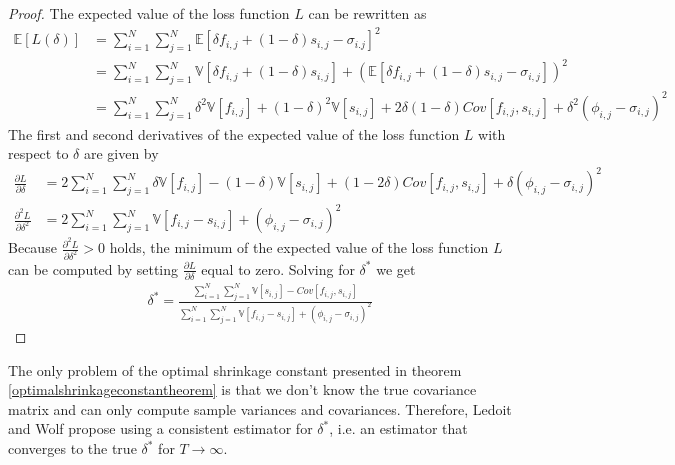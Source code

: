     	\begin{proof}
    	        The expected value of the loss function $L$ can be rewritten as
    	        \begin{align*}
    	            \mathbb{E}[L(\delta)] &= \sum_{i=1}^N \sum_{j=1}^N \mathbb{E}[\delta f_{i,j} + (1- \delta) s_{i,j} - \sigma_{i.j}]^2 \\
    	            &= \sum_{i=1}^N \sum_{j=1}^N \mathbb{V}[\delta f_{i,j} + (1 - \delta) s_{i,j}] + (\mathbb{E}[\delta f_{i,j} + (1- \delta) s_{i,j} - \sigma_{i,j}])^2 \\
    	            &= \sum_{i=1}^N \sum_{j=1}^N \delta^2 \mathbb{V}[f_{i,j}] + (1 - \delta)^2 \mathbb{V}[s_{i,j}] + 2 \delta (1 - \delta) Cov[f_{i,j}, s_{i,j}] + \delta^2 (\phi_{i,j} - \sigma_{i,j})^2
    	        \end{align*}
    	        The first and second derivatives of the expected value of the loss function $L$ with respect to $\delta$ are given by
    	        \begin{align*}
    	            \frac{\partial L}{\partial \delta} &= 2 \sum_{i=1}^N \sum_{j=1}^N \delta \mathbb{V}[f_{i,j}] - (1 - \delta) \mathbb{V}[s_{i,j}] + (1- 2 \delta) Cov[f_{i,j}, s_{i,j}] + \delta (\phi_{i,j} - \sigma_{i,j})^2 \\
    	            \frac{\partial^2 L}{\partial \delta^2} &= 2 \sum_{i=1}^N \sum_{j=1}^N \mathbb{V}[f_{i,j} - s_{i,j}] + (\phi_{i,j} - \sigma_{i,j})^2
    	        \end{align*}
    	        Because $ \frac{\partial^2 L}{\partial \delta^2} > 0$ holds, the minimum of the expected value of the loss function $L$ can be computed by setting $\frac{\partial L}{\partial \delta}$ equal to zero. Solving for $\delta^*$ we get
    	        \begin{align*}
    	            \delta^* = \frac{\sum_{i=1}^N \sum_{j=1}^N \mathbb{V}[s_{i,j}] - Cov[f_{i,j}, s_{i,j}]}{\sum_{i=1}^N \sum_{j=1}^N \mathbb{V}[f_{i,j} - s_{i,j}] + (\phi_{i,j} - \sigma_{i,j})^2}
    	        \end{align*}
    	\end{proof}
    	
    	The only problem of the optimal shrinkage constant presented in theorem \ref{optimalshrinkageconstantheorem} is that we don't know the true covariance matrix and can only compute sample variances and covariances. Therefore, Ledoit and Wolf propose using a consistent estimator for $\delta^*$, i.e. an estimator that converges to the true $\delta^*$ for $T \rightarrow \infty$.
    	
